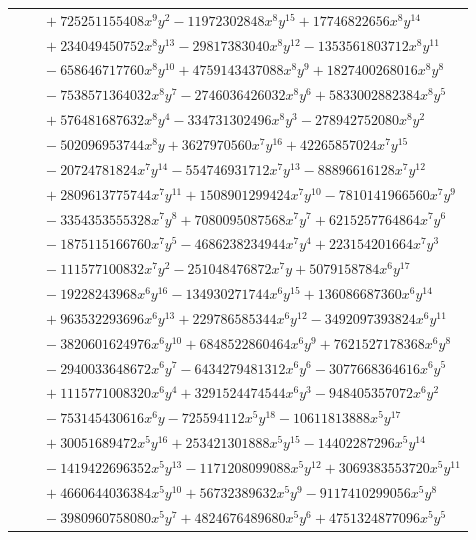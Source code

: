 \documentclass[11pt]{article}
\begin{document}
\begin{longtable}{@{}ll@{}}
 & $\quad +725251155408x^{9}y^{2}-11972302848x^{8}y^{15}+17746822656x^{8}y^{14}$\\
 & $\quad +234049450752x^{8}y^{13}-29817383040x^{8}y^{12}-1353561803712x^{8}y^{11}$\\
 & $\quad -658646717760x^{8}y^{10}+4759143437088x^{8}y^{9}+1827400268016x^{8}y^{8}$\\
 & $\quad -7538571364032x^{8}y^{7}-2746036426032x^{8}y^{6}+5833002882384x^{8}y^{5}$\\
 & $\quad +576481687632x^{8}y^{4}-334731302496x^{8}y^{3}-278942752080x^{8}y^{2}$\\
 & $\quad -502096953744x^{8}y+3627970560x^{7}y^{16}+42265857024x^{7}y^{15}$\\
 & $\quad -20724781824x^{7}y^{14}-554746931712x^{7}y^{13}-88896616128x^{7}y^{12}$\\
 & $\quad +2809613775744x^{7}y^{11}+1508901299424x^{7}y^{10}-7810141966560x^{7}y^{9}$\\
 & $\quad -3354353555328x^{7}y^{8}+7080095087568x^{7}y^{7}+6215257764864x^{7}y^{6}$\\
 & $\quad -1875115166760x^{7}y^{5}-4686238234944x^{7}y^{4}+223154201664x^{7}y^{3}$\\
 & $\quad -111577100832x^{7}y^{2}-251048476872x^{7}y+5079158784x^{6}y^{17}$\\
 & $\quad -19228243968x^{6}y^{16}-134930271744x^{6}y^{15}+136086687360x^{6}y^{14}$\\
 & $\quad +963532293696x^{6}y^{13}+229786585344x^{6}y^{12}-3492097393824x^{6}y^{11}$\\
 & $\quad -3820601624976x^{6}y^{10}+6848522860464x^{6}y^{9}+7621527178368x^{6}y^{8}$\\
 & $\quad -2940033648672x^{6}y^{7}-6434279481312x^{6}y^{6}-3077668364616x^{6}y^{5}$\\
 & $\quad +1115771008320x^{6}y^{4}+3291524474544x^{6}y^{3}-948405357072x^{6}y^{2}$\\
 & $\quad -753145430616x^{6}y-725594112x^{5}y^{18}-10611813888x^{5}y^{17}$\\
 & $\quad +30051689472x^{5}y^{16}+253421301888x^{5}y^{15}-14402287296x^{5}y^{14}$\\
 & $\quad -1419422696352x^{5}y^{13}-1171208099088x^{5}y^{12}+3069383553720x^{5}y^{11}$\\
 & $\quad +4660644036384x^{5}y^{10}+56732389632x^{5}y^{9}-9117410299056x^{5}y^{8}$\\
 & $\quad -3980960758080x^{5}y^{7}+4824676489680x^{5}y^{6}+4751324877096x^{5}y^{5}$\\

\end{longtable}
\end{document}
